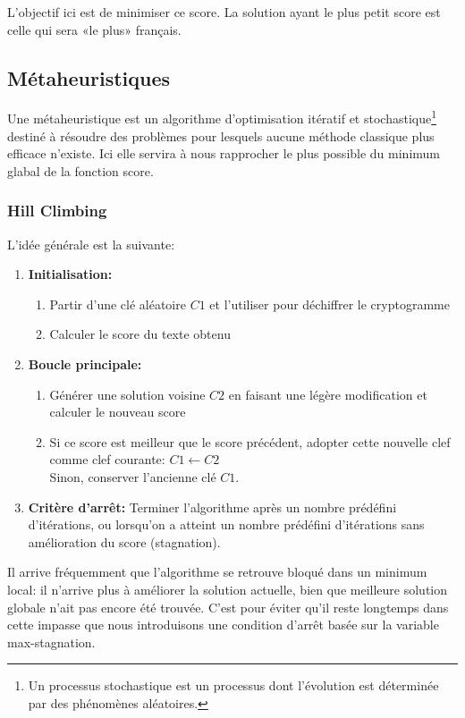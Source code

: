 \documentclass[a4paper]{article}
\begin{document}
L’objectif ici est de minimiser ce score. La solution ayant le plus petit score est celle qui sera «le plus» français.

\subsection{Métaheuristiques}

Une métaheuristique est un algorithme d’optimisation itératif et stochastique\footnote{Un processus stochastique est un processus dont l’évolution est déterminée par des phénomènes aléatoires.} destiné à résoudre des problèmes pour lesquels aucune méthode classique plus efficace n'existe. Ici elle servira à nous rapprocher le plus possible du minimum glabal de la fonction score.

\subsubsection{Hill Climbing}

L’idée générale est la suivante:
\begin{enumerate}
    \item \textbf{Initialisation:}
    \begin{enumerate}
        \item Partir d'une clé aléatoire $C1$ et l'utiliser pour déchiffrer le cryptogramme
        \item Calculer le score du texte obtenu
    \end{enumerate}
    \item \textbf{Boucle principale:}
    \begin{enumerate}[label= (\alph*)]
        \item \label{item:modification} Générer une solution voisine $C2$ en faisant une légère modification et calculer le nouveau score
        \item Si ce score est meilleur que le score précédent, adopter cette nouvelle clef comme clef courante: $C1 \leftarrow C2$\\
              Sinon, conserver l’ancienne clé $C1$.
    \end{enumerate}
    \item \textbf{Critère d'arrêt:} Terminer l'algorithme après un nombre prédéfini d'itérations, ou lorsqu'on a atteint un nombre prédéfini d'itérations sans amélioration du score (stagnation).
\end{enumerate}

Il arrive fréquemment que l’algorithme se retrouve bloqué dans un minimum local: il n’arrive plus à améliorer la solution actuelle, bien que meilleure solution globale n’ait pas encore été trouvée.  
C'est pour éviter qu'il reste longtemps dans cette impasse que nous introduisons une condition d'arrêt basée sur la variable max-stagnation.
\end{document}
